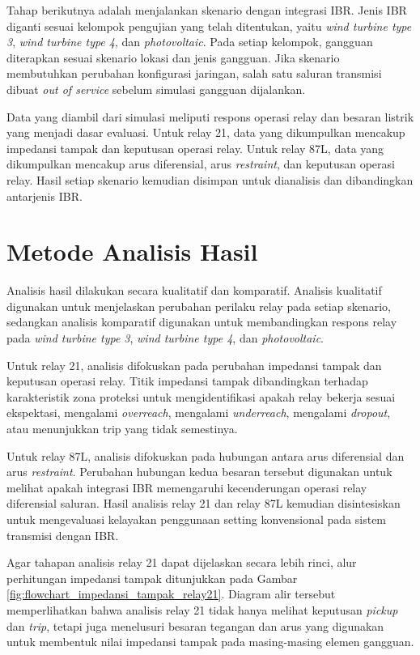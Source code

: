 Tahap berikutnya adalah menjalankan skenario dengan integrasi IBR. Jenis IBR diganti sesuai kelompok pengujian yang telah ditentukan, yaitu \textit{wind turbine type 3}, \textit{wind turbine type 4}, dan \textit{photovoltaic}. Pada setiap kelompok, gangguan diterapkan sesuai skenario lokasi dan jenis gangguan. Jika skenario membutuhkan perubahan konfigurasi jaringan, salah satu saluran transmisi dibuat \textit{out of service} sebelum simulasi gangguan dijalankan.

Data yang diambil dari simulasi meliputi respons operasi relay dan besaran listrik yang menjadi dasar evaluasi. Untuk relay 21, data yang dikumpulkan mencakup impedansi tampak dan keputusan operasi relay. Untuk relay 87L, data yang dikumpulkan mencakup arus diferensial, arus \textit{restraint}, dan keputusan operasi relay. Hasil setiap skenario kemudian disimpan untuk dianalisis dan dibandingkan antarjenis IBR.

\section{Metode Analisis Hasil}

Analisis hasil dilakukan secara kualitatif dan komparatif. Analisis kualitatif digunakan untuk menjelaskan perubahan perilaku relay pada setiap skenario, sedangkan analisis komparatif digunakan untuk membandingkan respons relay pada \textit{wind turbine type 3}, \textit{wind turbine type 4}, dan \textit{photovoltaic}.

Untuk relay 21, analisis difokuskan pada perubahan impedansi tampak dan keputusan operasi relay. Titik impedansi tampak dibandingkan terhadap karakteristik zona proteksi untuk mengidentifikasi apakah relay bekerja sesuai ekspektasi, mengalami \textit{overreach}, mengalami \textit{underreach}, mengalami \textit{dropout}, atau menunjukkan trip yang tidak semestinya.

Untuk relay 87L, analisis difokuskan pada hubungan antara arus diferensial dan arus \textit{restraint}. Perubahan hubungan kedua besaran tersebut digunakan untuk melihat apakah integrasi IBR memengaruhi kecenderungan operasi relay diferensial saluran. Hasil analisis relay 21 dan relay 87L kemudian disintesiskan untuk mengevaluasi kelayakan penggunaan setting konvensional pada sistem transmisi dengan IBR.

Agar tahapan analisis relay 21 dapat dijelaskan secara lebih rinci, alur perhitungan impedansi tampak ditunjukkan pada Gambar \ref{fig:flowchart_impedansi_tampak_relay21}. Diagram alir tersebut memperlihatkan bahwa analisis relay 21 tidak hanya melihat keputusan \textit{pickup} dan \textit{trip}, tetapi juga menelusuri besaran tegangan dan arus yang digunakan untuk membentuk nilai impedansi tampak pada masing-masing elemen gangguan.


